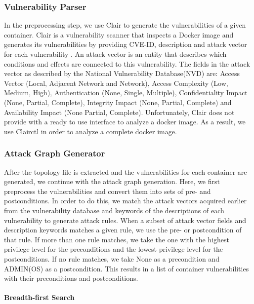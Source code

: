 	
\subsubsection{Vulnerability Parser}
\label{chap:vulnerability_p}

In the preprocessing step, we use Clair to generate the vulnerabilities of a given container. Clair is a vulnerability scanner that inspects a Docker image and generates its vulnerabilities by providing CVE-ID, description and attack vector for each vulnerability \cite{clair}. An attack vector is an entity that describes which conditions and effects are connected to this vulnerability. The fields in the attack vector as described by the National Vulnerability Database(NVD) \cite{booth2013national} are: Access Vector (Local, Adjacent Network and Network), Access Complexity (Low, Medium, High), Authentication (None, Single, Multiple), Confidentiality Impact (None, Partial, Complete), Integrity Impact (None, Partial, Complete) and Availability Impact (None Partial, Complete). Unfortunately, Clair does not provide with a ready to use interface to analyze a docker image. As a result, we use Clairctl \cite{clairctl} in order to analyze a complete docker image.


\subsubsection{Attack Graph Generator}
\label{chap:attack_graph_p}

After the topology file is extracted and the vulnerabilities for each container are generated, we continue with the attack graph generation. Here, we first preprocess the vulnerabilities and convert them into sets of pre- and postconditions. In order to do this, we match the attack vectors acquired earlier from the vulnerability database and keywords of the descriptions of each vulnerability to generate attack rules. When a subset of attack vector fields and description keywords matches a given rule, we use the pre- or postcondition of that rule. If more than one rule matches, we take the one with the highest privilege level for the preconditions and the lowest privilege level for the postconditions. If no rule matches, we take None as a precondition and ADMIN(OS) as a postcondition. This results in a list of container vulnerabilities with their preconditions and postconditions.

\paragraph{Breadth-first Search}
\label{chap:bfs}

